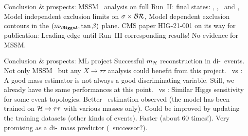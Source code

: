 \begin{frame}{Conclusion \& prospects: \HAtoTauTau}
\manip MSSM \HAtoTauTau\ analysis on full Run~II:
 final states: \tauh\tauh, \mu\tauh, \ele\tauh\ and \ele\mu,
\submanip Model independent exclusion limits on $\sigma\times\mathcal{BR}$,
\submanip Model dependent exclusion contours in the $(m_{\HiggsA}, \tan\beta)$ plane.
\manip CMS paper HIG-21-001 on its way for publication:
\submanip Leading-edge until Run~III corresponding results!
\manip No evidence for MSSM.
\end{frame}

\begin{frame}{Conclusion \& prospects: ML project}
\manip Successful $m_{\mathcal{H}}$ reconstruction in di-\tau\ events.
\submanip Not only MSSM \HAtoTauTau\ but any $X\to\tau\tau$ analysis could benefit from this project.
\manip \mml\ vs \mTtot:
\submanip A good mass estimator is not always a good discriminating variable.
\submanip Still, we already have the same performances at this point.
\manip \mml\ vs \msv:
\submanip Similar Higgs sensitivity for some event topologies.
\submanip Better \Zboson\ estimation observed (the model has been trained on $\mathcal{H}\to\tau\tau$ with various masses only).
\submanip Could be improved by updating the training datasets (other kinds of events).
\submanip Faster (about 60 times!).
\manip Very promising as a di-\tau\ mass predictor (\SVFIT\ successor?).
\end{frame}

